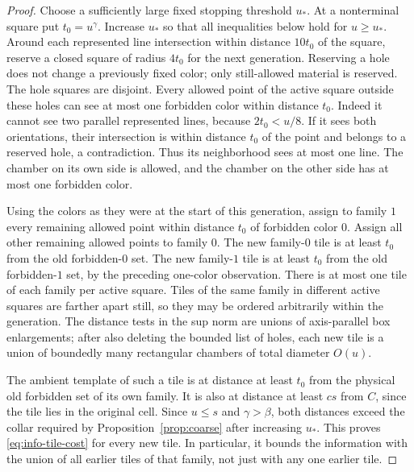 \documentclass[11pt]{article}
\numberwithin{equation}{section}
\theoremstyle{definition}
\theoremstyle{remark}
\begin{document}
\begin{proof}
Choose a sufficiently large fixed stopping threshold $u_*$.  At a
nonterminal square put $t_0=u^\gamma$.  Increase $u_*$ so that all
inequalities below hold for $u\ge u_*$.  Around each represented line
intersection within distance $10t_0$ of the square, reserve a closed
square of radius $4t_0$ for the next generation.  Reserving a hole does
not change a previously fixed color; only still-allowed material is
reserved.  The hole squares are disjoint.  Every allowed point of the
active square outside these holes can see at most one forbidden color
within distance $t_0$.  Indeed it cannot see two parallel represented
lines, because $2t_0<u/8$.  If it sees both orientations, their
intersection is within distance $t_0$ of the point and belongs to a
reserved hole, a contradiction.  Thus its neighborhood sees at most
one line.  The chamber on its own side is allowed, and the chamber on
the other side has at most one forbidden color.

Using the colors as they were at the start of this generation, assign
to family $1$ every remaining allowed point within distance $t_0$ of
forbidden color $0$.  Assign all other remaining allowed points to
family $0$.  The new family-$0$ tile is at least $t_0$ from the old
forbidden-$0$ set.  The new family-$1$ tile is at least $t_0$ from the
old forbidden-$1$ set, by the preceding one-color observation.  There
is at most one tile of each family per active square.  Tiles of the
same family in different active squares are farther apart still, so
they may be ordered arbitrarily within the generation.  The distance
tests in the sup norm are unions of axis-parallel box enlargements;
after also deleting the bounded list of holes, each new tile is a union
of boundedly many rectangular chambers of total diameter $O(u)$.

The ambient template of such a tile is at distance at least $t_0$ from
the physical old forbidden set of its own family.  It is also at
distance at least $cs$ from $C$, since the tile lies in the original
cell.  Since $u\le s$ and $\gamma>\beta$, both distances exceed the
collar required by Proposition~\ref{prop:coarse} after increasing $u_*$.
This proves \eqref{eq:info-tile-cost} for every new tile.  In particular,
it bounds the information with the union of all earlier tiles of that
family, not just with any one earlier tile.


\end{proof}
\end{document}
